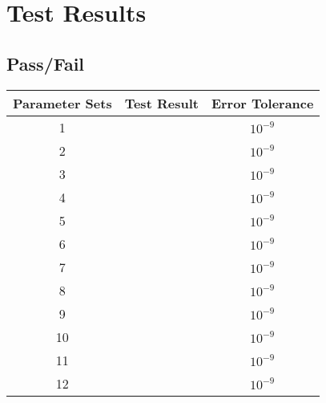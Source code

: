 \section{Test Results}

\subsection{Pass/Fail}

\begin{center}
\begin{tabular}{|c|c|c|}
\hline
Parameter Sets & Test Result & Error Tolerance \\ \hline \hline
1  & & $10^{-9}$ \\ \hline
2  & & $10^{-9}$ \\ \hline
3  & & $10^{-9}$ \\ \hline
4  && $10^{-9}$ \\ \hline
5  && $10^{-9}$ \\ \hline
6  &  & $10^{-9}$ \\ \hline
7  && $10^{-9}$ \\ \hline
8  & & $10^{-9}$ \\ \hline
9  & & $10^{-9}$ \\ \hline
10  && $10^{-9}$ \\ \hline
11  & & $10^{-9}$ \\ \hline
12  & & $10^{-9}$ \\ 
\hline

\end{tabular}
\end{center}

